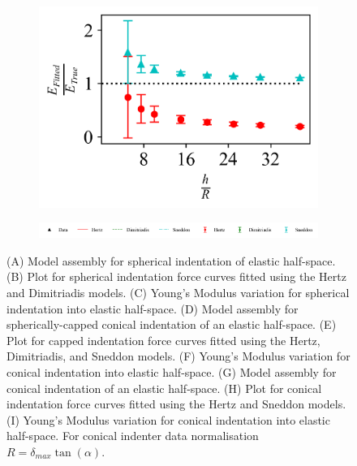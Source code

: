 \begin{figure}[H]
\begin{subfigure}[t]{0.32\textwidth}
        \includegraphics[width=1\linewidth]{Figures/Cone-Plane-Youngs_Modulus.png}
    \end{subfigure}
    
    \hfill
    
    \begin{subfigure}[t]{1\textwidth}
        \includegraphics[width=1\linewidth]{Figures/Planes-Legend.png}
    \end{subfigure}
    
    \caption{\label{fig: Plane-Data}(A) Model assembly for spherical indentation of elastic half-space. (B) Plot for spherical indentation force curves fitted using the Hertz and Dimitriadis models. (C) Young's Modulus variation for spherical indentation into elastic half-space. (D) Model assembly for spherically-capped conical indentation of an elastic half-space. (E) Plot for capped indentation force curves fitted using the Hertz, Dimitriadis, and Sneddon models. (F) Young's Modulus variation for conical indentation into elastic half-space. (G) Model assembly for conical indentation of an elastic half-space. (H) Plot for conical indentation force curves fitted using the Hertz and Sneddon models. (I) Young's Modulus variation for conical indentation into elastic half-space. For conical indenter data normalisation $R=\delta_{max}\tan(\alpha)$.}  
    
\end{figure}

